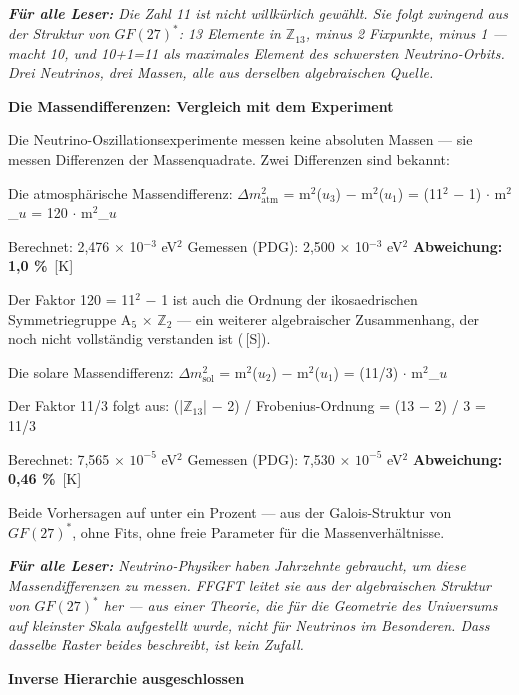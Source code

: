 \documentclass[11pt,oneside]{book}
\newcommand{\status}[1]{\penalty10000\,{\scriptsize\textcolor{gray!60}{[#1]}}}
\newenvironment{laierspur}{%
  \par\vspace{4pt}%
  \noindent\small\itshape\color{blue!60!black}%
  \textbf{Für alle Leser:}\enspace\ignorespaces}{%
  \par\vspace{4pt}\normalsize\normalfont\normalcolor}
\begin{document}
\begin{laierspur}
Die Zahl 11 ist nicht willkürlich gewählt. Sie folgt
zwingend aus der Struktur von $GF(27)^*$: 13 Elemente in $\mathbb{Z}_{13}$, minus 2
Fixpunkte, minus 1 — macht 10, und 10+1=11 als maximales Element des
schwersten Neutrino-Orbits. Drei Neutrinos, drei Massen, alle aus
derselben algebraischen Quelle.
\end{laierspur}

\textbf{Die Massendifferenzen: Vergleich mit dem Experiment}


Die Neutrino-Oszillationsexperimente messen keine absoluten Massen —
sie messen Differenzen der Massenquadrate. Zwei Differenzen sind bekannt:


Die atmosphärische Massendifferenz:
$\Delta m^2_\text{atm}$ = m$^2$($
u_3$) $-$ m$^2$($
u_1$) = (11$^2$ $-$ 1) $\cdot$ m$^2$\_$
u$ = 120 $\cdot$ m$^2$\_$
u$


Berechnet: 2,476 $\times$ 10$^{-3}$ eV$^2$
Gemessen (PDG): 2,500 $\times$ 10$^{-3}$ eV$^2$
\textbf{Abweichung: 1,0 \%} \status{K}


Der Faktor 120 = 11$^2$ $-$ 1 ist auch die Ordnung der ikosaedrischen
Symmetriegruppe A$_5$ $\times$ $\mathbb{Z}_2$ — ein weiterer algebraischer Zusammenhang,
der noch nicht vollständig verstanden ist (\status{S}).


Die solare Massendifferenz:
$\Delta m^2_\text{sol}$ = m$^2$($
u_2$) $-$ m$^2$($
u_1$) = (11/3) $\cdot$ m$^2$\_$
u$


Der Faktor 11/3 folgt aus:
(|$\mathbb{Z}_{13}$| $-$ 2) / Frobenius-Ordnung = (13 $-$ 2) / 3 = 11/3


Berechnet: 7,565 $\times$ $10^{-5}$ eV$^2$
Gemessen (PDG): 7,530 $\times$ $10^{-5}$ eV$^2$
\textbf{Abweichung: 0,46 \%} \status{K}


Beide Vorhersagen auf unter ein Prozent — aus der Galois-Struktur von
$GF(27)^*$, ohne Fits, ohne freie Parameter für die Massenverhältnisse.


\begin{laierspur}
Neutrino-Physiker haben Jahrzehnte gebraucht, um diese
Massendifferenzen zu messen. FFGFT leitet sie aus der algebraischen
Struktur von $GF(27)^*$ her — aus einer Theorie, die für die Geometrie
des Universums auf kleinster Skala aufgestellt wurde, nicht für
Neutrinos im Besonderen. Dass dasselbe Raster beides beschreibt,
ist kein Zufall.
\end{laierspur}

\textbf{Inverse Hierarchie ausgeschlossen}
\end{document}
